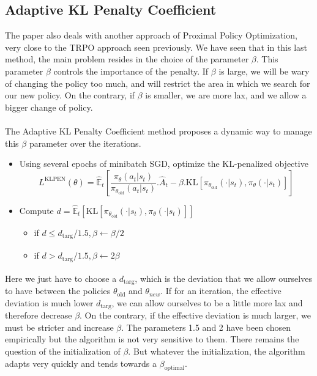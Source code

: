 \documentclass{article}
\begin{document}
\subsection{Adaptive KL Penalty Coefficient}

The paper also deals with another approach of Proximal Policy Optimization, very close to the TRPO approach seen previously. We have seen that in this last method, the main problem resides in the choice of the parameter $\beta$. This parameter $\beta$ controls the importance of the penalty. If $\beta$ is large, we will be wary of changing the policy too much, and will restrict the area in which we search for our new policy. On the contrary, if $\beta$ is smaller, we are more lax, and we allow a bigger change of policy.  
\\
\\
The Adaptive KL Penalty Coefficient method proposes a dynamic way to manage this $\beta$ parameter over the iterations.
\begin{itemize}
    \item Using several epochs of minibatch SGD, optimize the KL-penalized objective
    \begin{equation*}
        L^{\text{KLPEN}}(\theta) = \hat{\mathbb{E}}_t \left[ \frac{\pi_{\theta}(a_t|s_t)}{\pi_{\theta_{\text{old}}}(a_t|s_t)}.\hat{A}_t - \beta .\text{KL} [\pi_{\theta_{\text{old}}} (\cdot|s_t), \pi_{\theta}(\cdot | s_t)] \right]
    \end{equation*}
    \item Compute $d=\hat{\mathbb{E}}_t [\text{KL} [\pi_{\theta_{\text{old}}} (\cdot|s_t), \pi_{\theta}(\cdot | s_t)]]$
    \begin{itemize}
        \item if $d\leq d_{\text{targ}}/1.5,  \beta \xleftarrow[]{} \beta/2 $
        \item if $d > d_{\text{targ}}/1.5,  \beta \xleftarrow[]{} 2\beta $
    \end{itemize}
\end{itemize}



Here we just have to choose a $d_{\text{targ}}$, which is the deviation that we allow ourselves to have between the policies $\theta_{\text{old}}$ and $\theta_{new}$. If for an iteration, the effective deviation is much lower $d_{\text{targ}}$, we can allow ourselves to be a little more lax and therefore decrease $\beta$. On the contrary, if the effective deviation is much larger, we must be stricter and increase $\beta$.
The parameters 1.5 and 2 have been chosen empirically but the algorithm is not very sensitive to them. There remains the question of the initialization of $\beta$. But whatever the initialization, the algorithm adapts very quickly and tends towards a $\beta_{\text{optimal}}$.
\end{document}
